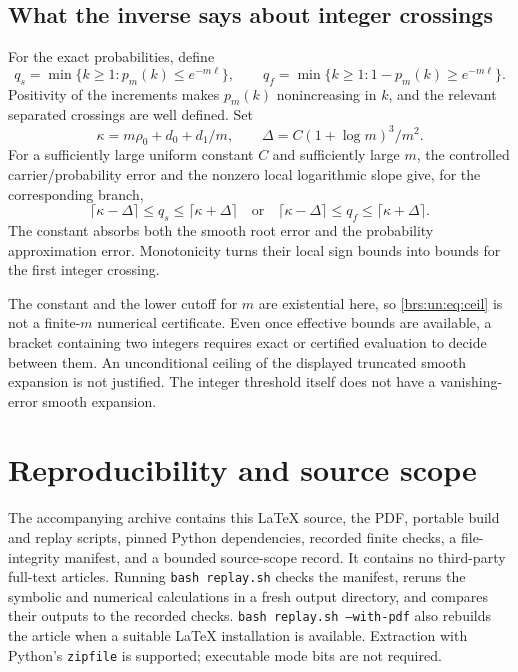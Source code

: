 \documentclass[11pt]{article}
\numberwithin{equation}{section}
\theoremstyle{remark}\newtheorem{remark}[theorem]{Remark}
\begin{document}
\subsection{What the inverse says about integer crossings}

For the exact probabilities, define
\begin{equation}\label{brs:un:eq:q}
 q_s=\min\{k\ge1:p_m(k)\le e^{-m\ell}\},\qquad
 q_f=\min\{k\ge1:1-p_m(k)\ge e^{-m\ell}\}.
\end{equation}
Positivity of the increments makes $p_m(k)$ nonincreasing in $k$,
and the relevant separated crossings are well defined.  Set
\[
 \kappa=m\rho_0+d_0+d_1/m,\qquad
 \Delta=C(1+\log m)^3/m^2.
\]
For a sufficiently large uniform constant $C$ and sufficiently large
$m$, the controlled carrier/probability error and the nonzero local
logarithmic slope give, for the corresponding branch,
\begin{equation}\label{brs:un:eq:ceil}
 \lceil\kappa-\Delta\rceil\le q_s\le
 \lceil\kappa+\Delta\rceil
 \quad\text{or}\quad
 \lceil\kappa-\Delta\rceil\le q_f\le
 \lceil\kappa+\Delta\rceil.
\end{equation}
The constant absorbs both the smooth root error and the probability
approximation error.  Monotonicity turns their local sign bounds into
bounds for the first integer crossing.

The constant and the lower cutoff for $m$ are existential here, so
\eqref{brs:un:eq:ceil} is not a finite-$m$ numerical certificate.  Even once
effective bounds are available, a bracket containing two integers
requires exact or certified evaluation to decide between them.
An unconditional ceiling of the displayed truncated smooth expansion
is not justified.  The integer threshold itself does not have a
vanishing-error smooth expansion.

\section{Reproducibility and source scope}\label{brs:un:sec:repro}

The accompanying archive contains this \LaTeX{} source, the PDF,
portable build and replay scripts, pinned Python dependencies,
recorded finite checks, a file-integrity manifest, and a bounded
source-scope record.  It contains no third-party full-text articles.
Running \texttt{bash replay.sh} checks the manifest, reruns the
symbolic and numerical calculations in a fresh output directory,
and compares their outputs to the recorded checks.
\texttt{bash replay.sh --with-pdf} also rebuilds the article when a
suitable \LaTeX{} installation is available.  Extraction with Python's
\texttt{zipfile} is supported; executable mode bits are not required.
\end{document}
